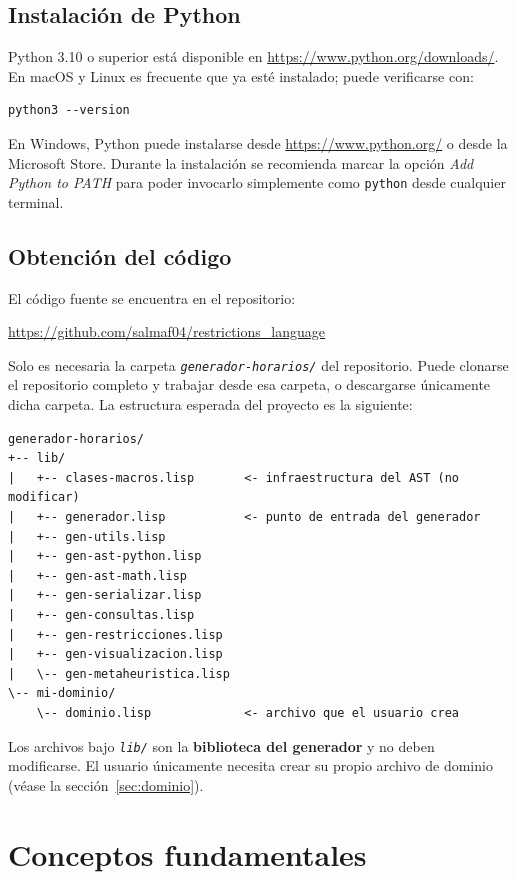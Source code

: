 \documentclass[12pt,a4paper]{article}
\newcommand{\code}[1]{\texttt{#1}}
\newcommand{\file}[1]{\texttt{\textit{#1}}}
\begin{document}
\subsection{Instalación de Python}

Python 3.10 o superior está disponible en \url{https://www.python.org/downloads/}.
En macOS y Linux es frecuente que ya esté instalado; puede verificarse con:

\begin{lstlisting}[style=shell]
python3 --version
\end{lstlisting}

En Windows, Python puede instalarse desde \url{https://www.python.org/} o
desde la Microsoft Store. Durante la instalación se recomienda marcar la
opción \textit{Add Python to PATH} para poder invocarlo simplemente como
\code{python} desde cualquier terminal.

\subsection{Obtención del código}

El código fuente se encuentra en el repositorio:
\begin{center}
  \url{https://github.com/salmaf04/restrictions_language}
\end{center}
Solo es necesaria la carpeta \file{generador-horarios/} del repositorio.
Puede clonarse el repositorio completo y trabajar desde esa carpeta, o
descargarse únicamente dicha carpeta. La estructura esperada del proyecto
es la siguiente:

\begin{verbatim}
generador-horarios/
+-- lib/
|   +-- clases-macros.lisp       <- infraestructura del AST (no modificar)
|   +-- generador.lisp           <- punto de entrada del generador
|   +-- gen-utils.lisp
|   +-- gen-ast-python.lisp
|   +-- gen-ast-math.lisp
|   +-- gen-serializar.lisp
|   +-- gen-consultas.lisp
|   +-- gen-restricciones.lisp
|   +-- gen-visualizacion.lisp
|   \-- gen-metaheuristica.lisp
\-- mi-dominio/
    \-- dominio.lisp             <- archivo que el usuario crea
\end{verbatim}

Los archivos bajo \file{lib/} son la \textbf{biblioteca del generador} y
no deben modificarse. El usuario únicamente necesita crear su propio
archivo de dominio (véase la sección~\ref{sec:dominio}).

\section{Conceptos fundamentales}
\end{document}
